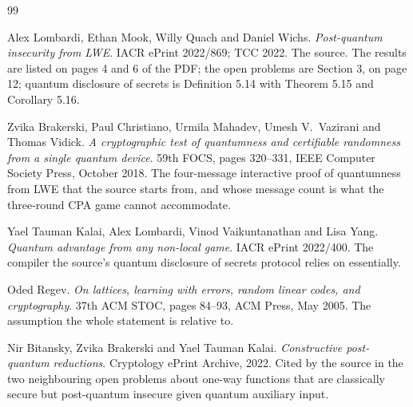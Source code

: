 \documentclass{aicr-conjecture}
\begin{document}
\begin{aicrbibliography}{99}

Alex Lombardi, Ethan Mook, Willy Quach and Daniel Wichs.
\emph{Post-quantum insecurity from LWE}.
IACR ePrint 2022/869; TCC 2022.
The source. The results are listed on pages 4 and 6 of the PDF\@; the open
problems are Section 3, on page 12; quantum disclosure of secrets is
Definition 5.14 with Theorem 5.15 and Corollary 5.16.

Zvika Brakerski, Paul Christiano, Urmila Mahadev, Umesh V.\ Vazirani and
Thomas Vidick.
\emph{A cryptographic test of quantumness and certifiable randomness from
a single quantum device}.
59th FOCS, pages 320--331, IEEE Computer Society Press, October 2018.
The four-message interactive proof of quantumness from LWE that the
source starts from, and whose message count is what the three-round CPA
game cannot accommodate.

Yael Tauman Kalai, Alex Lombardi, Vinod Vaikuntanathan and Lisa Yang.
\emph{Quantum advantage from any non-local game}.
IACR ePrint 2022/400.
The compiler the source's quantum disclosure of secrets protocol relies
on essentially.

Oded Regev.
\emph{On lattices, learning with errors, random linear codes, and
cryptography}.
37th ACM STOC, pages 84--93, ACM Press, May 2005.
The assumption the whole statement is relative to.

Nir Bitansky, Zvika Brakerski and Yael Tauman Kalai.
\emph{Constructive post-quantum reductions}.
Cryptology ePrint Archive, 2022.
Cited by the source in the two neighbouring open problems about one-way
functions that are classically secure but post-quantum insecure given
quantum auxiliary input.

\end{aicrbibliography}
\end{document}
